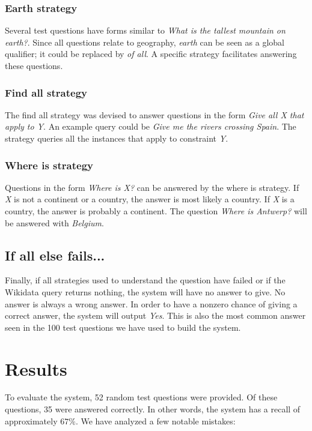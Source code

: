 \documentclass{article}
\begin{document}
\subsubsection{Earth strategy}
Several test questions have forms similar to \emph{What is the tallest mountain on earth?}. Since all questions relate to geography, \emph{earth} can be seen as a global qualifier; it could be replaced by \emph{of all}. A specific strategy facilitates answering these questions.

\subsubsection{Find all strategy}
The find all strategy was devised to answer questions in the form \emph{Give all X that apply to Y}. An example query could be \emph{Give me the rivers crossing Spain}. The strategy queries all the instances that apply to constraint \emph{Y}.

\subsubsection{Where is strategy}
Questions in the form \emph{Where is X?} can be answered by the where is strategy. If \emph{X} is not a continent or a country, the answer is most likely a country. If \emph{X} is a country, the answer is probably a continent. The question \emph{Where is Antwerp?} will be answered with \emph{Belgium}.

\subsection{If all else fails...}
Finally, if all strategies used to understand the question have failed or if the Wikidata query returns nothing, the system will have no answer to give. No answer is always a wrong answer. In order to have a nonzero chance of giving a correct answer, the system will output \emph{Yes}. This is also the most common answer seen in the 100 test questions we have used to build the system.

\section{Results}
To evaluate the system, 52 random test questions were provided. Of these questions, 35 were answered correctly. In other words, the system has a recall of approximately $67\%$. We have analyzed a few notable mistakes:
\end{document}
